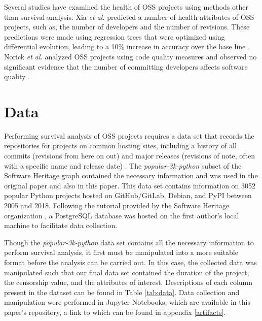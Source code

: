 \documentclass[acmconf]{acmart}
\begin{document}
Several studies have examined the health of OSS projects using methods other than survival analysis. 
Xia \emph{et al.} predicted a number of health attributes of OSS projects, such as, the number of developers and the number of revisions. 
These predictions were made using regression trees that were optimized using differential evolution, leading to a 10\% increase in accuracy over the base line \cite{xia2020predicting}. 
Norick \emph{et al.} analyzed OSS projects using code quality measures and observed no significant evidence that the number of committing developers affects software quality \cite{norick2010effects}. 

\section{Data} \label{data}

Performing survival analysis of OSS projects requires a data set that records the repositories for projects on common hosting sites, including a history of all commits (revisions from here on out) and major releases (revisions of note, often with a specific name and release date) \cite{ali2020cheating}. 
The \emph{popular-3k-python} subset of the Software Heritage graph \cite{pietri2019software} contained the necessary information and was used in the original paper and also in this paper.
This data set contains information on 3052 popular Python projects hosted on GitHub/GitLab, Debian, and PyPI between 2005 and 2018.
Following the tutorial provided by the Software Heritage organization \cite{SQLdataset}, a PostgreSQL database was hosted on the first author's local machine to facilitate data collection.

Though the \emph{popular-3k-python} data set contains all the necessary information to perform survival analysis, it first must be manipulated into a more suitable format before the analysis can be carried out. 
In this case, the collected data was manipulated such that our final data set contained the duration of the project, the censorship value, and the attributes of interest. 
Descriptions of each column present in the dataset can be found in Table \ref{tab:data}. 
Data collection and manipulation were performed in Jupyter Notebooks, which are available in this paper's repository, a link to which can be found in appendix \ref{artifacts}. 
\end{document}
